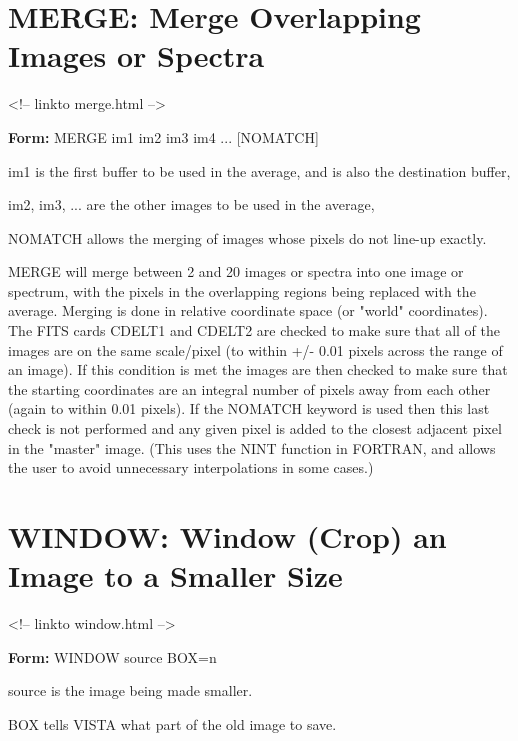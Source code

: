 \section{MERGE: Merge Overlapping Images or Spectra}
\begin{rawhtml}
<!-- linkto merge.html -->
\end{rawhtml}
\begin{command}
  \item[\textbf{Form: }MERGE im1 im2 im3 im4 ... {[NOMATCH]}\hfill]{}
  \item[im1]{is the first buffer to be used in the average,
       and is also the destination buffer,}
  \item[im2, im3, ...]{are the other images to be used in the average,}
  \item[NOMATCH]{allows the merging of images whose pixels do not
line-up exactly.}
\end{command}

MERGE will merge between 2 and 20 images or spectra into one image or
spectrum, with the pixels in the overlapping regions being replaced with
the average.  Merging is done in relative coordinate space (or "world"
coordinates). The FITS cards CDELT1 and CDELT2 are checked to make sure that
all of the images are on the same scale/pixel (to within +/- 0.01 pixels
across the range of an image).  If this condition is met the images are
then checked to make sure that the starting coordinates are an integral
number of pixels away from each other (again to within 0.01 pixels).  If
the NOMATCH keyword is used then this last check is not performed and any
given pixel is added to the closest adjacent pixel in the "master" image.
(This uses the NINT function in FORTRAN, and allows the user to avoid
unnecessary interpolations in some cases.)

\section{WINDOW: Window (Crop) an Image to a Smaller Size}
\begin{rawhtml}
<!-- linkto window.html -->
\end{rawhtml}
\begin{command}
  \item[\textbf{Form: }WINDOW source BOX=n\hfill]{}
  \item[source]{is the image being made smaller.}
  \item[BOX]{tells VISTA what part of the old image to save.}
\end{command}

